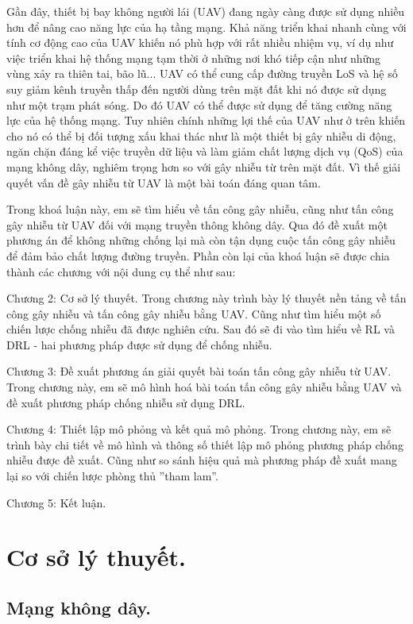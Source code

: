 \documentclass{uetgraduation}
\begin{document}
Gần đây, thiết bị bay không người lái (UAV) đang ngày càng được sử dụng nhiều hơn để nâng cao năng lực của hạ tầng mạng. Khả năng
triển khai nhanh cùng với tính cơ động cao của UAV khiến nó phù hợp với rất nhiều nhiệm vụ, ví dụ như việc triển khai hệ thống
mạng tạm thời ở những nơi khó tiếp cận như những vùng xảy ra thiên tai, bão lũ... UAV có thể cung cấp đường truyền LoS và hệ số suy
giảm kênh truyền thấp đến người dùng trên mặt đất khi nó được sử dụng như một trạm phát sóng. Do đó UAV có thể được sử dụng để
tăng cường năng lực của hệ thống mạng. Tuy nhiên chính những lợi thế của UAV như ở trên khiến cho nó có thể bị đối tượng xấu 
khai thác như là một thiết bị gây nhiễu di động, ngăn chặn đáng kể việc truyền dữ liệu và làm giảm chất lượng dịch vụ (QoS) của mạng
không dây, nghiêm trọng hơn so với gây nhiễu từ trên mặt đất. Vì thế giải quyết vấn đề gây nhiễu từ UAV là một bài toán đáng quan tâm.

Trong khoá luận này, em sẽ tìm hiểu về tấn công gây nhiễu, cũng như tấn công gây nhiễu từ UAV đối với mạng truyền thông không dây.
Qua đó đề xuất một phương án để không những chống lại mà còn tận dụng cuộc tấn công gây nhiễu để đảm bảo chất lượng đường truyền.
Phần còn lại của khoá luận sẽ được chia thành các chương với nội dung cụ thể như sau:

Chương 2: Cơ sở lý thuyết. Trong chương này trình bày lý thuyết nền tảng về tấn công gây nhiễu và tấn công gây nhiễu bằng UAV.
Cũng như tìm hiểu một số chiến lược chống nhiễu đã được nghiên cứu. Sau đó sẽ đi vào tìm hiểu về RL và DRL - hai phương pháp được
sử dụng để chống nhiễu.

Chương 3: Đề xuất phương án giải quyết bài toán tấn công gây nhiễu từ UAV. Trong chương này, em sẽ mô hình hoá bài toán tấn công
gây nhiễu bằng UAV và đề xuất phương pháp chống nhiễu sử dụng DRL.

Chương 4: Thiết lập mô phỏng và kết quả mô phỏng. Trong chương này, em sẽ trình bày chi tiết về mô hình và thông số thiết lập mô
phỏng phương pháp chống nhiễu được đề xuất. Cũng như so sánh hiệu quả mà phương pháp đề xuất mang lại so với chiến lược phòng thủ
''tham lam''.

Chương 5: Kết luận.

\chapter{Cơ sở lý thuyết.}
\section{Mạng không dây.}
\end{document}

